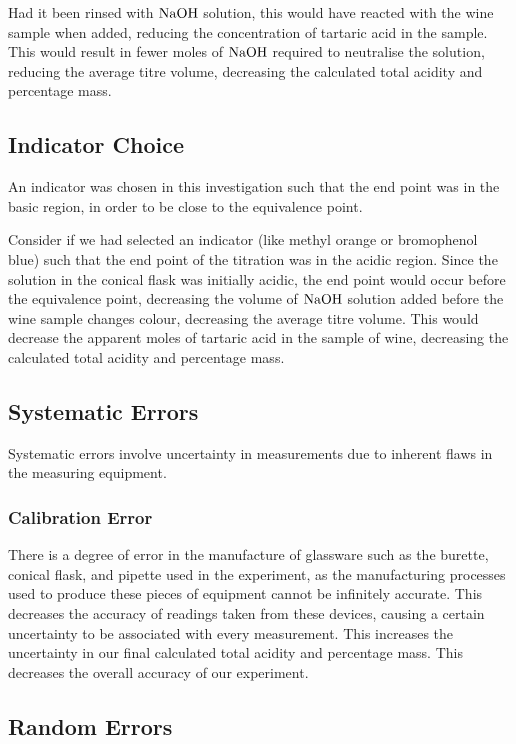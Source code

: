 \documentclass[a4paper,11pt]{article}
\begin{document}
Had it been rinsed with $\ce{NaOH}$ solution, this would have reacted with the
wine sample when added, reducing the concentration of tartaric acid in the
sample. This would result in fewer moles of $\ce{NaOH}$ required to neutralise
the solution, reducing the average titre volume, decreasing the calculated
total acidity and percentage mass.


\subsection{Indicator Choice}

An indicator was chosen in this investigation such that the end point was in the
basic region, in order to be close to the equivalence point.

Consider if we had selected an indicator (like methyl orange or bromophenol blue) such that the end point of the
titration was in the acidic region. Since the solution in the conical flask was initially acidic, the end
point would occur before the equivalence point, decreasing the volume of $\ce{NaOH}$
solution added before the wine sample changes colour, decreasing the average
titre volume. This would decrease the apparent moles of tartaric acid in the sample of wine,
decreasing the calculated total acidity and percentage mass.


\subsection{Systematic Errors}

Systematic errors involve uncertainty in measurements due to inherent flaws
in the measuring equipment.


\subsubsection{Calibration Error}

There is a degree of error in the manufacture of glassware such as the burette,
conical flask, and pipette used in the experiment, as the manufacturing
processes used to produce these pieces of equipment cannot be infinitely
accurate. This decreases the accuracy of readings taken from these devices,
causing a certain uncertainty to be associated with every measurement. This
increases the uncertainty in our final calculated total acidity and percentage
mass. This decreases the overall accuracy of our experiment.


\subsection{Random Errors}
\end{document}
